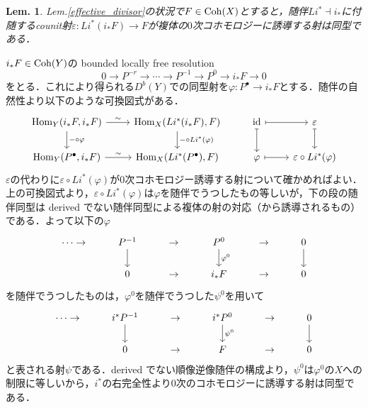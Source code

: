 \documentclass[uplatex,a4paper,11pt,dvipdfmx]{jsarticle}
\makeatletter
\theoremstyle{mystyle} %
\newtheorem{lemma}[theorem]{Lem.}
\renewenvironment{proof}[1][\proofname]{\par
 \pushQED{\qed}%
 \normalfont \topsep6\p@\@plus6\p@\relax
 \trivlist
 \item[\hskip\labelsep
 \itshape
 {\bf\underline{#1}}]\ignorespaces
}{%
 \popQED\endtrivlist\@endpefalse
}
\DeclareMathOperator{\Hom}{Hom}
\DeclareMathOperator{\id}{id}
\makeatother
\begin{document}

\begin{lemma}\label{counit_map}
	Lem.\ref{effective_divisor}の状況で$F \in \operatorname{Coh}(X)$とすると，随伴$Li^* \dashv i_*$に付随するcounit射$\varepsilon \colon Li^*(i_*F) \to F$が複体の$0$次コホモロジーに誘導する射は同型である．
\end{lemma}
\begin{proof}
	$i_*F \in \operatorname{Coh}(Y)$の bounded locally free resolution
	$$0 \to P^{-r}\to\cdots\to P^{-1}\to P^0 \to i_* F \to 0$$
	をとる．これにより得られる$D^b(Y)$での同型射を$\varphi \colon P^\bullet \to i_*F$とする．随伴の自然性より以下のような可換図式がある．
	\[
		\begin{tikzcd}
			\Hom_Y(i_*F, i_*F) \arrow[r, "\sim"]\arrow[d, "- \circ \varphi"] & \Hom_X(Li^*(i_*F), F) \arrow[d, "- \circ Li^*(\varphi)"]&\id \arrow[r, mapsto]\arrow[d, mapsto] & \varepsilon \arrow[d, mapsto]\\
			\Hom_Y(P^\bullet, i_*F) \arrow[r, "\sim"] & \Hom_X(Li^*(P^\bullet), F)&\varphi \arrow[r, mapsto] & \varepsilon \circ Li^*(\varphi)
		\end{tikzcd}
	\]
	$\varepsilon$の代わりに$\varepsilon \circ Li^*(\varphi)$が$0$次コホモロジー誘導する射について確かめればよい．上の可換図式より，$\varepsilon \circ Li^*(\varphi)$は$\varphi$を随伴でうつしたもの等しいが，下の段の随伴同型は derived でない随伴同型による複体の射の対応（から誘導されるもの）である．よって以下の$\varphi$
	\[
		\begin{tikzcd}
			\cdots\to &P^{-1}\arrow[d]&\to &P^0 \arrow[d, "\varphi^0"] &\to &0\arrow[d]\\
			&0&\to& i_*F & \to &0
		\end{tikzcd}
	\]
	を随伴でうつしたものは，$\varphi^0$を随伴でうつした$\psi^0$を用いて
	\[
		\begin{tikzcd}
			\cdots\to &i^*P^{-1}\arrow[d]&\to &i^*P^0 \arrow[d, "\psi^0"] &\to &0\arrow[d]\\
			&0&\to& F & \to &0
		\end{tikzcd}
	\]
	と表される射$\psi$である．derived でない順像逆像随伴の構成より，$\psi^0$は$\varphi^0$の$X$への制限に等しいから，$i^*$の右完全性より$0$次のコホモロジーに誘導する射は同型である．


\end{proof}
\end{document}

